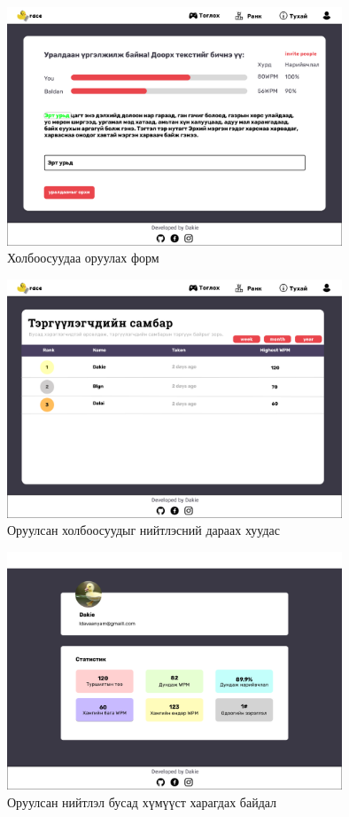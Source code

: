 \begin{figure}[h]
	\centering
	\includegraphics[width=10cm]{images/interfaces/ver1/playpage.png}
	\caption{Холбоосуудаа оруулах форм}
	\label{fig:interface-v1-02}
\end{figure}

\begin{figure}[h]
	\centering
	\includegraphics[width=10cm]{images/interfaces/ver1/leaderboard.png}
	\caption{Оруулсан холбоосуудыг нийтлэсний дараах хуудас}
	\label{fig:interface-v1-03}
\end{figure}

\begin{figure}[h]
	\centering
	\includegraphics[width=10cm]{images/interfaces/ver1/profilepage.png}
	\caption{Оруулсан нийтлэл бусад хүмүүст харагдах байдал}
	\label{fig:interface-v1-04}
\end{figure}

